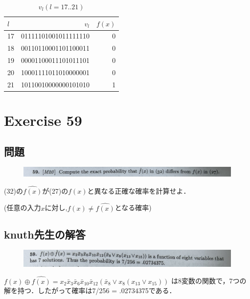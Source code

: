 \documentclass[dvipdfmx,a4paper,12pt]{jsarticle}
\begin{document}
  \begin{table}[h]
 \caption{$v_{l}(l=17..21)$}
 {\scriptsize
 \hspace{4cm}
 \begin{tabular}{l|r|r}

 $l$ & $v_{l}$ & $f(x)$  \\ \hline
17 &01111101001011111110 & 0\\
18 &00110110001101100011&0\\
19 &00001100011101011101&0\\
20 &10001111011010000001&0\\
21 &10110010000000101010&1 \\
\end{tabular}
 }
 \end{table}


  
\newpage
\section*{Exercise 59}
\subsection*{問題}
 \begin{figure}[htbp]
  \centering
  \includegraphics[width=142mm,angle=0]{images/59.jpg}
  \end{figure}
  (32)の$\hat{f(x)}$が(27)の$f(x)$と異なる正確な確率を計算せよ．
  
  (任意の入力$x$に対し,$f(x) \neq \hat{f(x)}$となる確率)

 \subsection*{knuth先生の解答}
 \begin{figure}[htbp]
  \centering
  \includegraphics[width=142mm,angle=0]{images/59a.jpg}
  \end{figure}
  
  $f(x) \oplus \hat{f(x)} = x_{2}\bar{x}_{3}\bar{x}_{6}\bar{x}_{10}\bar{x}_{12}(\bar{x}_{8} \lor x_{8} (x_{13} \lor x_{15}))$
  は8変数の関数で，7つの解を持つ．したがって確率は7/256 = .02734375である．
\end{document}
